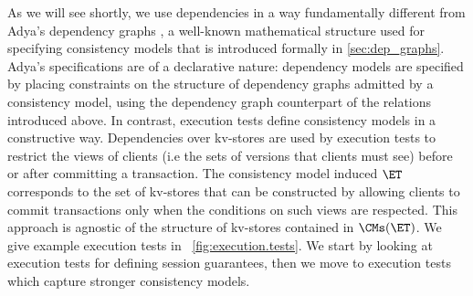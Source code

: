 

As we will see shortly, we use dependencies in a way fundamentally 
different from Adya's dependency graphs \cite{adya}, 
a well-known mathematical structure used for specifying consistency models that is introduced 
formally in \cref{sec:dep_graphs}.
Adya's specifications are of a declarative nature: dependency models are specified by 
placing constraints on the structure of dependency graphs admitted by a consistency model, using the dependency graph counterpart 
of the relations introduced above. 
In contrast, execution tests define consistency models in a constructive way. Dependencies 
over kv-stores are used by execution tests to restrict the views of clients (i.e the sets of versions that clients must see) before or 
after committing a transaction. The consistency model induced $\ET$ corresponds 
to the set of kv-stores that can be constructed by allowing clients to commit transactions only 
when the conditions on such views are respected. This approach is agnostic of the structure 
of kv-stores contained in $\CMs(\ET)$.
%
We give example execution tests in
~\cref{fig:execution.tests}. 
We start by looking at  execution tests for defining  session
guarantees, then we move to execution tests which capture stronger
consistency models. 

